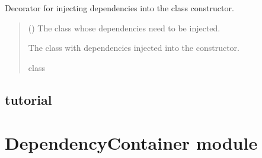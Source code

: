 \documentclass[letterpaper,10pt,english]{sphinxmanual}
\begin{document}
\begin{fulllineitems}
\label{\detokenize{modules:inject.Inject}}
\pysigstartsignatures
{}
\pysigstopsignatures
\sphinxAtStartPar
Decorator for injecting dependencies into the class constructor.
\begin{quote}\begin{description}
\sphinxAtStartPar
{} () \textendash{} The class whose dependencies need to be injected.

\sphinxAtStartPar
The class with dependencies injected into the constructor.

\sphinxAtStartPar
class

\end{description}\end{quote}

\end{fulllineitems}



\section{tutorial}
\label{\detokenize{modules:tutorial}}
\sphinxstepscope


\chapter{DependencyContainer module}
\label{\detokenize{DependencyContainer:module-DependencyContainer}}\label{\detokenize{DependencyContainer:dependencycontainer-module}}\label{\detokenize{DependencyContainer::doc}}
\end{document}
